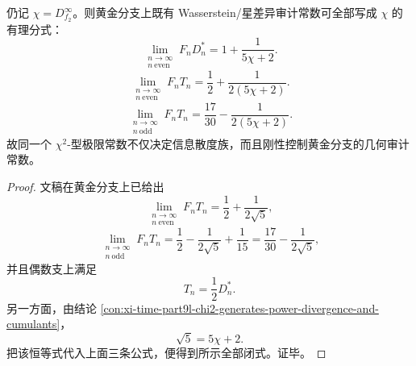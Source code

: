\begin{corollary}\label{cor:xi-time-part64ba-chi2-recovers-golden-geometric-audits}
仍记 \(\chi=D_{f_2}^\infty\)。则黄金分支上既有 Wasserstein/星差异审计常数可全部写成 \(\chi\) 的有理分式：
\[
\boxed{\;
\lim_{\substack{n\to\infty\\ n\ \mathrm{even}}}F_n D_n^\ast
=
1+\frac{1}{5\chi+2}.\;}
\]
\[
\boxed{\;
\lim_{\substack{n\to\infty\\ n\ \mathrm{even}}}F_n T_n
=
\frac12+\frac{1}{2(5\chi+2)}.\;}
\]
\[
\boxed{\;
\lim_{\substack{n\to\infty\\ n\ \mathrm{odd}}}F_n T_n
=
\frac{17}{30}-\frac{1}{2(5\chi+2)}.\;}
\]
故同一个 \(\chi^2\)-型极限常数不仅决定信息散度族，而且刚性控制黄金分支的几何审计常数。
\end{corollary}
\begin{proof}
文稿在黄金分支上已给出
\[
\lim_{\substack{n\to\infty\\ n\ \mathrm{even}}}F_nT_n
=
\frac12+\frac{1}{2\sqrt5},
\]
\[
\lim_{\substack{n\to\infty\\ n\ \mathrm{odd}}}F_nT_n
=
\frac12-\frac{1}{2\sqrt5}+\frac{1}{15}
=
\frac{17}{30}-\frac{1}{2\sqrt5},
\]
并且偶数支上满足
\[
T_n=\frac12 D_n^\ast.
\]
另一方面，由结论 \ref{con:xi-time-part9l-chi2-generates-power-divergence-and-cumulants}，
\[
\sqrt5=5\chi+2.
\]
把该恒等式代入上面三条公式，便得到所示全部闭式。证毕。
\end{proof}

